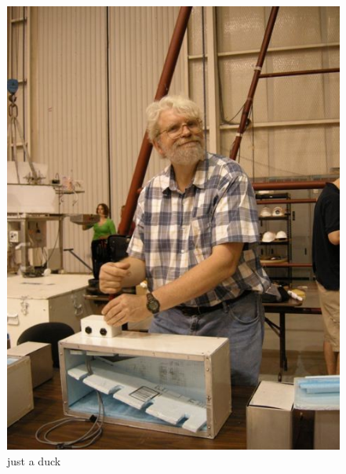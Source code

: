 \begin{figure}[h!]
  \begin{center}
      \includegraphics[width=\textwidth]{./figures/duck.jpg}
      \caption{just a duck}
      \label{fig:duck}
  \end{center}
\end{figure}

